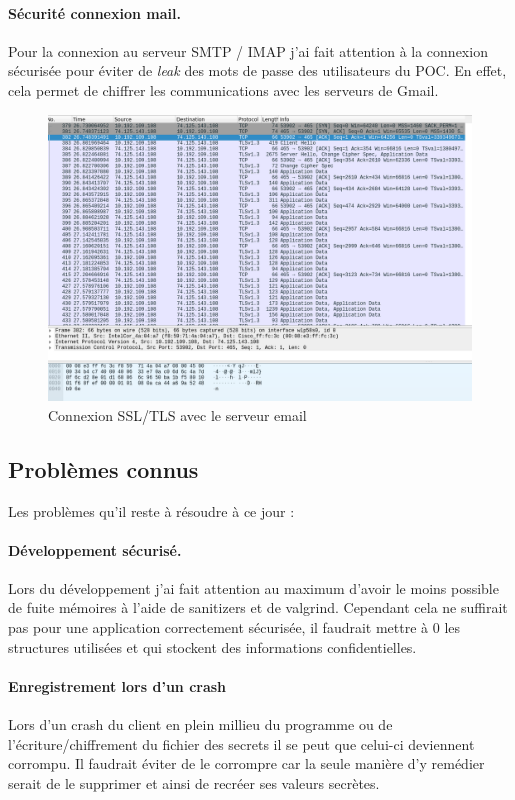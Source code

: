 \paragraph*{Sécurité connexion mail.}
Pour la connexion au serveur SMTP / IMAP j'ai fait attention à la connexion sécurisée pour éviter de \textit{leak} des mots de passe des utilisateurs du POC. En effet, cela permet de chiffrer les communications avec les serveurs de Gmail.
\begin{figure}[h!]
	\centering
	\includegraphics[width=14cm]{images/packetProofEncrypted.png}
	\caption{Connexion SSL/TLS avec le serveur email}
	\label{fig:securityProofEmail}
\end{figure}
\subsection{Problèmes connus}
Les problèmes qu'il reste à résoudre à ce jour :
\paragraph*{Développement sécurisé.}
Lors du développement j'ai fait attention au maximum d'avoir le moins possible de fuite mémoires à l'aide de sanitizers et de valgrind. Cependant cela ne suffirait pas pour une application correctement sécurisée, il faudrait mettre à 0 les structures utilisées et qui stockent des informations confidentielles.
\paragraph*{Enregistrement lors d'un crash}
Lors d'un crash du client en plein millieu du programme ou de l'écriture/chiffrement du fichier des secrets il se peut que celui-ci deviennent corrompu. Il faudrait éviter de le corrompre car la seule manière d'y remédier serait de le supprimer et ainsi de recréer ses valeurs secrètes.
